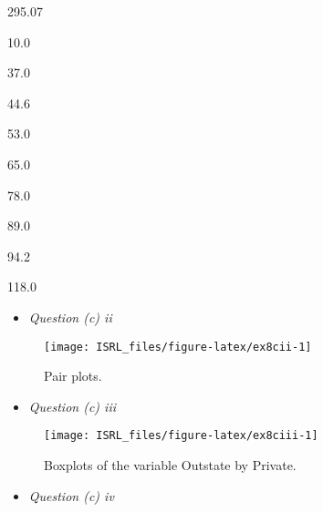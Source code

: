 \documentclass[]{book}
\newenvironment{Shaded}{\begin{snugshade}}{\end{snugshade}}
\newcommand{\DataTypeTok}[1]{\textcolor[rgb]{0.13,0.29,0.53}{#1}}
\newcommand{\DecValTok}[1]{\textcolor[rgb]{0.00,0.00,0.81}{#1}}
\newcommand{\KeywordTok}[1]{\textcolor[rgb]{0.13,0.29,0.53}{\textbf{#1}}}
\newcommand{\NormalTok}[1]{#1}
\newcommand{\OperatorTok}[1]{\textcolor[rgb]{0.81,0.36,0.00}{\textbf{#1}}}
\newcommand{\StringTok}[1]{\textcolor[rgb]{0.31,0.60,0.02}{#1}}
\providecommand{\tightlist}{%
  \setlength{\itemsep}{0pt}\setlength{\parskip}{0pt}}
\begin{document}
295.07

10.0

37.0

44.6

53.0

65.0

78.0

89.0

94.2

118.0

\begin{itemize}
\tightlist
\item
  \emph{Question (c) ii}
\end{itemize}

\begin{figure}

{\centering \texttt{[image: ISRL\_files/figure-latex/ex8cii-1]} 

}

\caption{Pair plots.}\label{fig:ex8cii}
\end{figure}

\begin{itemize}
\tightlist
\item
  \emph{Question (c) iii}
\end{itemize}

\begin{figure}

{\centering \texttt{[image: ISRL\_files/figure-latex/ex8ciii-1]} 

}

\caption{Boxplots of the variable Outstate by Private.}\label{fig:ex8ciii}
\end{figure}

\begin{itemize}
\tightlist
\item
  \emph{Question (c) iv}
\end{itemize}

\begin{Shaded}
\end{Shaded}

\begin{Shaded}
\end{Shaded}
\end{document}
